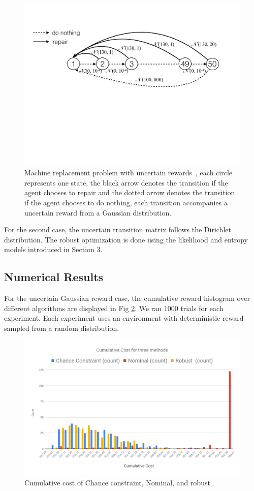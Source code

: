 \documentclass[11pt,reqno]{amsart}
\theoremstyle{definition}
\numberwithin{equation}{section}
\theoremstyle{remark}
\begin{document}
\begin{figure}
\centering
    \includegraphics[width=0.8\linewidth]{images/mrp.pdf}

 \caption{Machine replacement problem with uncertain rewards~\cite{delage2010percentile}, each circle represents one state, the black arrow denotes the transition if the agent chooses to repair and the dotted arrow denotes the transition if the agent chooses to do nothing, each transition accompanies a uncertain reward from a Gaussian distribution.}
\label{machine_reward_map}
\end{figure}

\medskip
For the second case, the uncertain transition matrix follows the Dirichlet distribution. The robust optimization is done using the likelihood and entropy models introduced in Section 3.



\subsection{Numerical Results}
For the uncertain Gaussian reward case, the cumulative reward histogram over different algorithms are displayed in Fig \ref{machine_reward_distribution}. We ran 1000 trials for each experiment. Each experiment uses an environment with deterministic reward sampled from a random distribution. 

\begin{figure}
    \centering
    \includegraphics[width=0.8\linewidth]{images/MR-cost.png}
\caption{Cumulative cost of Chance constraint, Nominal, and robust}
\label{machine_reward_distribution}
\end{figure}
\end{document}
